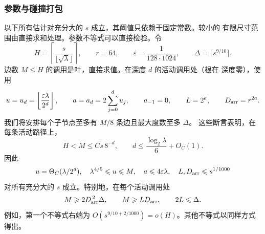 \subsubsection{参数与碰撞打包}
\label{subsec:tensor-packing}

以下所有估计对充分大的 $s$ 成立，其阈值只依赖于固定常数。较小的
有限尺寸范围由直接求和处理。参数不等式可以直接检验。令
\[
 H=\left\lceil\frac{s}{\lfloor\sqrt\lambda\rfloor}\right\rceil,
 \qquad r=64,\qquad \varepsilon=\frac1{128\cdot1024},
 \qquad \Delta=\lceil s^{9/10}\rceil.
\]
边数 $M\le H$ 的调用是叶，直接求值。在深度 $d$ 的活动调用处（根在
深度零），使用
\begin{equation}\label{eq:tensor-parameters}
 u=u_d=\left\lfloor\frac{\varepsilon\lambda}{2^d}\right\rfloor,
 \qquad a=a_d=2\sum_{j=0}^d u_j,\qquad
 a_{-1}=0,\qquad L=2^a,\qquad D_{\rm arr}=r^{2a}.
\end{equation}
我们将安排每个子节点至多有 $M/8$ 条边且最大度数至多 $\Delta$。
这些断言表明，在每条活动路径上，
\[
 H<M\le Cs\,8^{-d},\qquad
 d\le\frac{\log_2\lambda}{6}+O_C(1).
\]
因此
\begin{equation}\label{eq:tensor-parameter-bounds}
 u=\Theta_C(\lambda/2^d),\quad
 \lambda^{4/5}\le u\le M,\quad
 a\le4\varepsilon\lambda,\quad
 L,D_{\rm arr}\le s^{1/1000}
\end{equation}
对所有充分大的 $s$ 成立。特别地，在每个活动调用处
\begin{equation}\label{eq:tensor-packing-conditions}
 M\ge2D_{\rm arr}^{\,2}\Delta,\qquad
 M\ge L D_{\rm arr},\qquad 2L\le\Delta.
\end{equation}
例如，第一个不等式右端为
$O(s^{9/10+2/1000})=o(H)$。其他不等式以同样方式得出。

